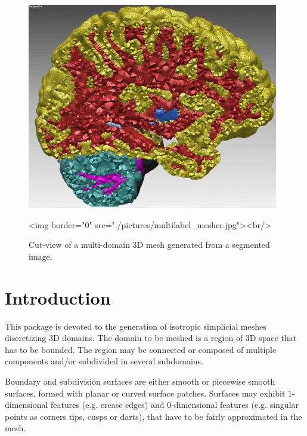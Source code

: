 \begin{figure}[ht]
\begin{center}
 \begin{ccTexOnly}
   \includegraphics[height=9cm]{Mesh_3/pictures/multilabel_mesher}
 \end{ccTexOnly}
 \begin{ccHtmlOnly}
   <img border="0" src="./pictures/multilabel_mesher.jpg"><br/>
 \end{ccHtmlOnly}
 \caption{Cut-view of a multi-domain 3D mesh generated from a segmented image.}
  \label{figure:multilabel_mesher}
\end{center}
\end{figure}

\section{Introduction}
\label{Mesh_3_section_intro}

This package is devoted to the generation of  isotropic simplicial
meshes discretizing 3D domains.
The domain to be meshed is a region of 3D space that has to be bounded.
The region may be connected or  composed of multiple components
and/or subdivided in several subdomains. 

Boundary and subdivision surfaces  are either
smooth or piecewise smooth surfaces, formed with planar or curved surface patches.
Surfaces may exhibit $1$-dimensional features (e.g. crease edges)
and $0$-dimensional features (e.g. singular points as corners
 tips, cusps or darts), that have to be fairly
approximated in the mesh.

